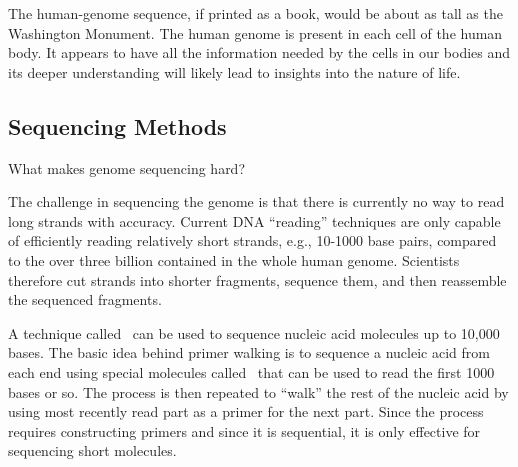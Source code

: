 \begin{cluster}
\label{grp:rmrk:genome::human-genome}

\begin{remark}
\label{rmrk:genome::human-genome}
The human-genome sequence, if printed as a book, would be
about as tall as the Washington Monument.
The human genome is present in each cell of the human body. 
It appears to have all the information needed by the cells in our
bodies and its deeper understanding will likely lead to insights into
the nature of life.

\end{remark}
\end{cluster}


\subsection{Sequencing Methods}
\label{sec:genome::sequencing-methods}

\begin{cluster}
\label{grp:tch:genome::makes}

\begin{teachask}
\label{tch:genome::makes}
What makes genome sequencing hard?

\end{teachask}
\end{cluster}

\begin{cluster}
\label{grp:grm:genome::challenge}

\begin{gram}
\label{grm:genome::challenge}
The challenge in sequencing the genome is that there is currently
no way to read long strands with accuracy. 
Current DNA ``reading'' techniques are only capable of efficiently
reading relatively short strands, e.g., 10-1000 base pairs, compared
to the over three billion contained in the whole human genome.
Scientists therefore cut strands into shorter fragments, sequence
them, and then reassemble the sequenced fragments.

\end{gram}
\end{cluster}

\begin{cluster}
\label{grp:grm:genome::primer-walking}

\begin{gram}
\label{grm:genome::primer-walking}
A technique called~ can be used to sequence
nucleic acid molecules up to 10,000 bases.  
The basic idea behind primer walking is to sequence a nucleic acid
from each end using special molecules called~ that can
be used to read the first 1000 bases or so.
The process is then repeated to ``walk'' the rest of the nucleic acid
by using most recently read part as a primer for the next part.
Since the process requires constructing primers and since it is
sequential, it is only effective for sequencing short molecules.

\end{gram}
\end{cluster}

